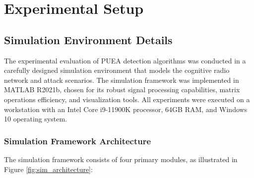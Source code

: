 

\chapter{Experimental Setup}

\section{\texorpdfstring{\large\textbf{Simulation Environment Details}}{Simulation Environment Details}}

The experimental evaluation of PUEA detection algorithms was conducted in a carefully designed simulation environment that models the cognitive radio network and attack scenarios. The simulation framework was implemented in MATLAB R2021b, chosen for its robust signal processing capabilities, matrix operations efficiency, and visualization tools. All experiments were executed on a workstation with an Intel Core i9-11900K processor, 64GB RAM, and Windows 10 operating system.

\subsection{Simulation Framework Architecture}

The simulation framework consists of four primary modules, as illustrated in Figure \ref{fig:sim_architecture}:

